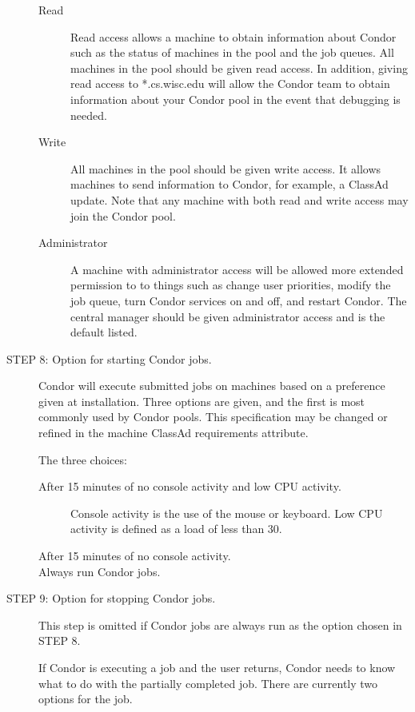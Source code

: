\begin{description}
     \begin{description}
     \item[Read]
     Read access allows a machine to obtain information about
     Condor such as the status of machines in the pool and the
     job queues.
     All machines in the pool should be given read access. 
     In addition, giving read access to *.cs.wisc.edu 
     will allow the Condor team to obtain information about
     your Condor pool in the event that debugging is needed.
     \item[Write]
     All machines in the pool should be given write access. 
     It allows machines to send information to Condor, for
     example, a ClassAd update.
     Note that any machine with both read and write access
     may join the Condor pool.
     \item[Administrator]
     A machine with administrator access will be allowed more
     extended permission to to things such as
     change user priorities, modify the job queue,
     turn Condor services on and off,
     and restart Condor.
     The central manager should be given administrator access
     and is the default listed.
     \end{description}

\item[STEP 8: Option for starting Condor jobs.]
     Condor will execute submitted jobs on machines based on
     a preference given at installation.
     Three options are given, and the first is most commonly used
     by Condor pools.
     This specification may be changed or refined in
     the machine ClassAd requirements attribute.

     The three choices:
     \begin{description}
     \item[After 15 minutes of no console activity and low CPU activity.]
     Console activity is the use of the mouse or keyboard.
     Low CPU activity is defined as a load of less than 30\Percent. 
     \item[After 15 minutes of no console activity.]
     \item[Always run Condor jobs.]
     \end{description}

\item[STEP 9: Option for stopping Condor jobs.]
     This step is omitted if Condor jobs are always run as
     the option chosen in STEP 8.

     If Condor is executing a job and the user returns,
     Condor needs to know what to do with the partially completed job.
     There are currently two options for the job.


\end{description}
